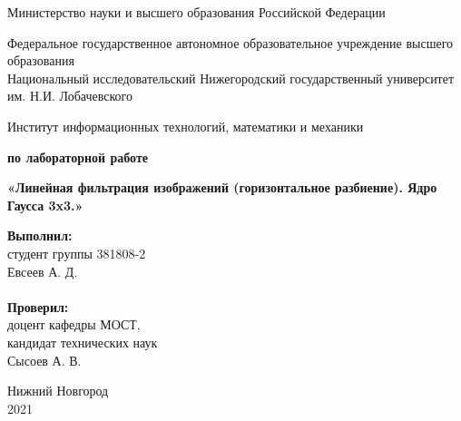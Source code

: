 \documentclass{report}
\begin{document}
\begin{titlepage}

\begin{center}
Министерство науки и высшего образования Российской Федерации
\end{center}

\begin{center}
Федеральное государственное автономное образовательное учреждение высшего образования \\
Национальный исследовательский Нижегородский государственный университет им. Н.И. Лобачевского
\end{center}

\begin{center}
Институт информационных технологий, математики и механики
\end{center}

\vspace{4em}

\begin{center}
\textbf{ по лабораторной работе} \\
\end{center}
\begin{center}
\textbf{\Large«Линейная фильтрация изображений (горизонтальное разбиение). Ядро Гаусса 3x3.»} \\
\end{center}

\vspace{4em}

\newbox{\lbox}
\newlength{\maxl}
\setlength{\maxl}{\wd\lbox}
\hfill\parbox{7cm}{
\hspace*{5cm}\hspace*{-5cm}\textbf{Выполнил:} \\ студент группы 381808-2 \\ Евсеев А. Д.\\
\\
\hspace*{5cm}\hspace*{-5cm}\textbf{Проверил:}\\ доцент кафедры МОСТ, \\ кандидат технических наук \\ Сысоев А. В.\\
}
\vspace{\fill}

\begin{center} Нижний Новгород \\ 2021 \end{center}

\end{titlepage}
\end{document}
